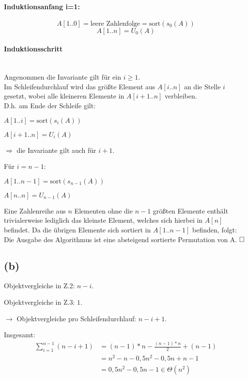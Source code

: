 \documentclass[a4paper,12pt]{article}
\begin{document}
\paragraph{Induktionsanfang i=1:}
$$
A[1..0]=\text{leere Zahlenfolge}=\text{sort}(s_0(A))
$$
$$
A[1..n]=U_0(A)
$$

\paragraph{Induktionsschritt}\mbox{}\\
\indent Angenommen die Invariante gilt für ein $i \ge 1$. \\
Im Schleifendurchlauf wird das größte Element aus $A[i..n]$ an die Stelle $i$ gesetzt, wobei alle kleineren Elemente in $A[i+1..n]$ verbleiben. \\
D.h. am Ende der Schleife gilt:
\begin{description}
	\item $A[1..i]=\text{sort}(s_i(A))$
	\item $A[i+1..n]=U_i(A)$
	\item $\Rightarrow$ die Invariante gilt auch für $i+1$.
\end{description}
Für $i=n-1$:
\begin{description}
	\item $A[1..n-1]=\text{sort}(s_{n-1}(A))$
	\item $A[n..n]=U_{n-1}(A)$
\end{description}
Eine Zahlenreihe aus $n$ Elementen ohne die $n-1$ größten Elemente enthält trivialerweise lediglich das kleinste Element, welches sich hierbei in $A[n]$ befindet. Da die übrigen Elemente sich sortiert in $A[1..n-1]$ befinden, folgt: \\
\indent Die Ausgabe des Algorithmus ist eine absteigend sortierte Permutation von A. $\hfill\square$

\subsection{(b)}
\begin{description}
	\item Objektvergleiche in Z.2: $n-i$.
	\item Objektvergleiche in Z.3: $1$.
	\item $\rightarrow$ Objektvergleiche pro Schleifendurchlauf: $n-i+1$.
\end{description}
Insgesamt:
\begin{equation}
\begin{split}
\sum_{i=1}^{n-1}(n-i+1) & = (n-1)*n-\frac{(n-1)*n}{2}+(n-1) \\
& = n^2-n-0,5n^2-0,5n+n-1 \\
& = 0,5n^2-0,5n-1 \in \Theta(n^2)
\end{split}
\end{equation}
\end{document}
